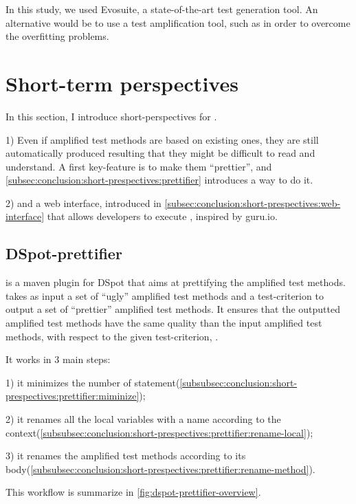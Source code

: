 In this study, we used Evosuite, a state-of-the-art test generation tool.
An alternative would be to use a test amplification tool, such as \dspot in order to overcome the overfitting problems.

\section{Short-term perspectives}
\label{sec:conclusion:short-prespectives}

In this section, I introduce short-perspectives for \dspot.

1) Even if amplified test methods are based on existing ones, they are still automatically produced resulting that they might be difficult to read and understand.
A first key-feature is to make them ``prettier'', and \autoref{subsec:conclusion:short-prespectives:prettifier} introduces a way to do it.

2) and a web interface, introduced in \autoref{subsec:conclusion:short-prespectives:web-interface} that allows developers to execute \dspot, inspired by guru.io.

\subsection{DSpot-prettifier}
\label{subsec:conclusion:short-prespectives:prettifier}

\dspotprettifier is a maven plugin for DSpot that aims at prettifying the amplified test methods.
\dspotprettifier takes as input a set of ``ugly'' amplified test methods and a test-criterion to output a set of ``prettier'' amplified test methods.
It ensures that the outputted amplified test methods have the same quality than the input amplified test methods, with respect to the given test-criterion, \eg \ms.

It works in 3 main steps:

1) it minimizes the number of statement(\autoref{subsubsec:conclusion:short-prespectives:prettifier:miminize});

2) it renames all the local variables with a name according to the context(\autoref{subsubsec:conclusion:short-prespectives:prettifier:rename-local});

3) it renames the amplified test methods according to its body(\autoref{subsubsec:conclusion:short-prespectives:prettifier:rename-method}).

This workflow is summarize in \autoref{fig:dspot-prettifier-overview}.

